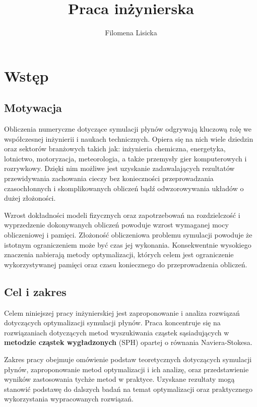 \documentclass{article}
\title{Praca inżynierska}
\author{Filomena Lisicka}
\begin{document}
\renewcommand{\thelstlisting}{\thesection.\arabic{lstlisting}}

\tableofcontents
\newpage

\section{Wstęp}
\subsection{Motywacja}
Obliczenia numeryczne dotyczące symulacji płynów odgrywają kluczową rolę we współczesnej inżynierii i naukach technicznych. 
Opiera się na nich wiele dziedzin oraz sektorów branżowych takich jak: inżynieria chemiczna, energetyka, lotnictwo, motoryzacja, meteorologia, a także przemysły gier komputerowych i rozrywkowy. 
Dzięki nim możliwe jest uzyskanie zadawalających rezultatów przewidywania zachowania cieczy bez konieczności przeprowadzania czasochłonnych i skomplikowanych obliczeń 
bądź odwzorowywania układów o dużej złożoności.\newline\newline

Wzrost dokładności modeli fizycznych oraz zapotrzebowań na rozdzielczość i wyprzedzenie dokonywanych obliczeń powoduje wzrost wymaganej mocy obliczeniowej i pamięci. 
Złożoność obliczeniowa problemu symulacji powoduje że istotnym ograniczeniem może być czas jej wykonania. Konsekwentnie wysokiego znaczenia nabierają metody optymalizacji, 
których celem jest ograniczenie wykorzystywanej pamięci oraz czasu koniecznego do przeprowadzenia obliczeń.\newline

\subsection{Cel i zakres}
Celem niniejszej pracy inżynierskiej jest zaproponowanie i analiza rozwiązań dotyczących optymalizacji symulacji płynów. 
Praca koncentruje się na rozwiązaniach dotyczących metod wyszukiwania cząstek sąsiadujących w \textbf{metodzie cząstek wygładzonych} (SPH) opartej o równania Naviera-Stokesa.\newline\newline

Zakres pracy obejmuje omówienie podstaw teoretycznych dotyczących symulacji płynów, zaproponowanie metod optymalizacji i ich analizę, 
oraz przedstawienie wyników zastosowania tychże metod w praktyce. Uzyskane rezultaty mogą stanowić podstawę do dalszych badań na temat optymalizacji 
oraz praktycznego wykorzystania wypracowanych rozwiązań.\newline
\end{document}
